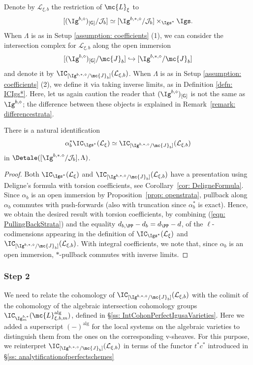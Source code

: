 \documentclass[letterpaper,11pt]{amsart}
\begin{document}
Denote by $\mathcal{L}_{\xi, b}$ the restriction of $\mc{L}_\xi$ to
\[[(\Ig^{b,\diamond})_{[\mathsf{G}]}/\mathcal{J}_{b}]\simeq [\Ig^{b,\ast,\diamond}/\mathcal{J}_{b}] \times_{\Igs^\ast}\Igs.\]
When $\Lambda$ is as in Setup \ref{assumption: coefficients} (1), we can consider the intersection complex for $\mathcal{L}_{\xi, b}$ along the open immersion 
\[[(\Ig^{b,\diamond})_{[\mathsf{G}]}/\mc{J}_b]\hookrightarrow[\Ig^{b,\ast,\diamond}/\mc{J}_b]\]
and denote it by $\IC_{[\Ig^{b,\ast,\diamond}/\mc{J}_b]}(\mathcal{L}_{\xi, b})$. When $\Lambda$ is as in Setup \ref{assumption: coefficients} (2), we define it via taking inverse limits, as in Definition \ref{defn: ICIgs*}. Here, let us again caution the reader that $(\Ig^{b,\diamond})_{[\mathsf{G}]}$ is not the same as $\Ig^{b,\diamond}$; the difference between these objects is explained in Remark~\ref{remark: differencestrata}. 
\begin{lemma}\label{lem: restrictionICtocapstrata}
    There is a natural identification
    \[\alpha_b^\ast\IC_{\Igs^\ast}(\mathcal{L}_{\xi}) \simeq \IC_{[\Ig^{b,\ast,\diamond}/\mc{J}_b]}(\mathcal{L}_{\xi, b}) \]
    in $\Detale([\Ig^{b,*.\diamond}/\mathcal{J}_{b}],\Lambda)$. 
\end{lemma}
\begin{proof}
    Both $\IC_{\Igs^\ast}(\mathcal{L}_{\xi})$ and $\IC_{[\Ig^{b,\ast,\diamond}/\mc{J}_b]}(\mathcal{L}_{\xi,b})$ have a presentation using Deligne's formula with torsion coefficients, see Corollary~\ref{cor: DeligneFormula}. Since $\alpha_b$ is an open immersion by Proposition~\ref{prop: openstrata}, pullback along $\alpha_b$ commutes with push-forwards (also with truncation since $\alpha_b^\ast$ is exact). Hence, we obtain the desired result with torsion coefficients, by combining (\ref{eqn: PullingBackStrata}) and the equality $d_{b,\PP} - d_{b} = d_{\PP} - d$, of the $\ell$-codimensions appearing in the definition of $\IC_{\Igs^\ast}(\mathcal{L}_{\xi})$ and $\IC_{[\Ig^{b,\ast,\diamond}/\mc{J}_b]}(\mathcal{L}_{\xi, b})$. With integral coefficients, we note that, since $\alpha_{b}$ is an open immersion, $*$-pullback commutes with inverse limits.
\end{proof}

\subsubsection{Step 2} We need to relate the cohomology of $\IC_{[\Ig^{b,\ast,\diamond}/\mc{J}_b]}(\mathcal{L}_{\xi,b})$ with the colimit of the cohomology of the algebraic intersection cohomology groups $\IC_{\Ig^{b,\ast}_{m}}(\mc{L}_{\xi,b,m}^\mathrm{alg})$, defined in \S \ref{ss: IntCohonPerfectIgusaVarieties}. Here we added a superscript ${(-)}^\mathrm{alg}$ for the local systems on the algebraic varieties to distinguish them from the ones on the corresponding v-sheaves. For this purpose, we reinterpret $\IC_{[\Ig^{b,\ast,\diamond}/\mc{J}_b]}(\mathcal{L}_{\xi,b})$ in terms of the functor $t^\ast c^\ast$ introduced in \S \ref{ss: analytificationofperfectschemes} 
\end{document}
